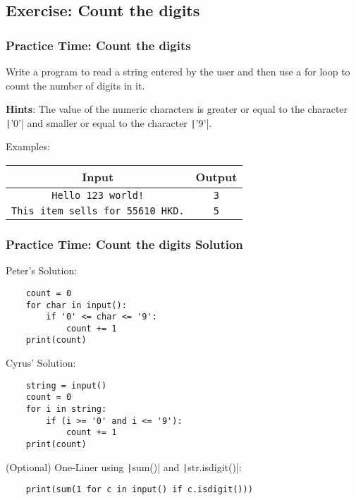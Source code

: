 \documentclass{beamer}
\begin{document}
\subsection{Exercise: Count the digits}
\begin{frame}[fragile]
    \frametitle{Practice Time: Count the digits}

    Write a program to read a string entered by the user and
    then use a for loop to count the number of digits in it.

    \textbf{Hints}: The value of the numeric characters is
    greater or equal to the character \texttt|'0'|
    and smaller or equal to the character \texttt|'9'|.

    Examples:

    \begin{tabular}{|c|c|}
        \hline
        Input                                   & Output     \\ \hline
        \texttt{Hello 123 world!}               & \texttt{3} \\ \hline
        \texttt{This item sells for 55610 HKD.} & \texttt{5} \\ \hline
    \end{tabular}
\end{frame}
\begin{frame}[fragile]
    \frametitle{Practice Time: Count the digits Solution}

    Peter's Solution:
    \begin{verbatim}
    count = 0
    for char in input():
        if '0' <= char <= '9':
            count += 1
    print(count)
    \end{verbatim}

    Cyrus' Solution:
    \begin{verbatim}
    string = input()
    count = 0
    for i in string:
        if (i >= '0' and i <= '9'):
            count += 1
    print(count)
    \end{verbatim}
    (Optional) One-Liner using \texttt|sum()| and \texttt|str.isdigit()|:
    \begin{verbatim}
    print(sum(1 for c in input() if c.isdigit()))
    \end{verbatim}
\end{frame}
\end{document}
